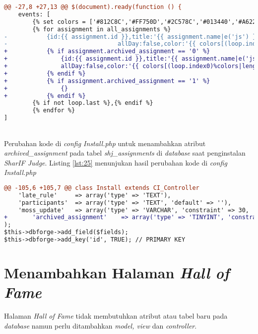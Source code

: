 \begin{lstlisting}[language=diff, caption=Perubahan kode program pada halaman \textit{dashboard.twig}, label=lst:24, basicstyle=\ttfamily, frame=single,
columns=fullflexible, keepspaces=true, breaklines=true]
@@ -27,8 +27,13 @@ $(document).ready(function () {
	events: [
		{% set colors = ['#812C8C','#FF750D','#2C578C','#013440','#A6222C','#42758C','#02A300','#BA6900'] %}
		{% for assignment in all_assignments %}
-       	{id:{{ assignment.id }},title:'{{ assignment.name|e('js') }}', start:'{{ assignment.start_time }}', end:' {{ assignment.finish_time }}',
-                               allDay:false,color:'{{ colors[(loop.index0)%colors|length] }}'}
+       	{% if assignment.archived_assignment == '0' %}
+           	{id:{{ assignment.id }},title:'{{ assignment.name|e('js') }}', start:'{{ assignment.start_time }}', end:' {{ assignment.finish_time }}',
+               allDay:false,color:'{{ colors[(loop.index0)%colors|length] }}'}
+        	{% endif %}
+        	{% if assignment.archived_assignment == '1' %}
+           	{}
+        	{% endif %}
		{% if not loop.last %},{% endif %}
		{% endfor %}
]
\end{lstlisting}
~\\
Perubahan kode di \textit{config Install.php} untuk menambahkan atribut \textit{archived\_assignment} pada tabel \textit{shj\_assignments} di \textit{database} saat penginstalan \textit{SharIF Judge}. Listing \ref{lst:25} menunjukan hasil perubahan kode di \textit{config Install.php}

\begin{lstlisting}[language=diff, caption=Perubahan kode program pada \textit{Install.php}, label=lst:25, basicstyle=\ttfamily, frame=single,
columns=fullflexible, keepspaces=true, breaklines=true]
@@ -105,6 +105,7 @@ class Install extends CI_Controller
	'late_rule'     => array('type' => 'TEXT'),
	'participants'  => array('type' => 'TEXT', 'default' => ''),
	'moss_update'   => array('type' => 'VARCHAR', 'constraint' => 30, 'default' => 'Never'),
+   	'archived_assignment'    => array('type' => 'TINYINT', 'constraint' => 1),
);
$this->dbforge->add_field($fields);
$this->dbforge->add_key('id', TRUE); // PRIMARY KEY
\end{lstlisting}

\section{Menambahkan Halaman \textit{Hall of Fame}}
Halaman \textit{Hall of Fame} tidak membutuhkan atribut atau tabel baru pada \textit{database} namun perlu ditambahkan \textit{model, view} dan \textit{controller}.

